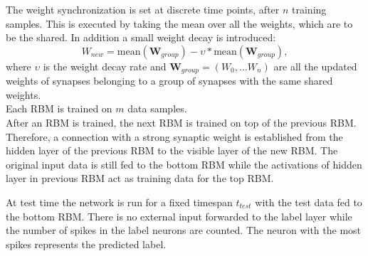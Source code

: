 The weight synchronization is set at discrete time points, after $n$ training samples.
This is executed by taking the mean over all the weights, which are to be the shared.
In addition a small weight decay is introduced:
\[
W_{new} = \text{mean}(\textbf{W}_{group}) - \upsilon * \text{mean}(\textbf{W}_{group}) , 
\]
where $\upsilon$ is the weight decay rate and $\textbf{W}_{group} = (W_0 ,... W_n)$ are all the updated weights of synapses belonging to a group of synapses with the same shared weights.
\\
Each RBM is trained on $m$ data samples.
\\
After an RBM is trained, the next RBM is trained on top of the previous RBM.
Therefore, a connection with a strong synaptic weight is established from the hidden layer of the previous RBM to the visible layer of the new RBM.
The original input data is still fed to the bottom RBM while the activations of hidden layer in previous RBM act as training data for the top RBM.


At test time the network is run for a fixed timespan $t_{test}$ with the test data fed to the bottom RBM.
There is no external input forwarded to the label layer while the number of spikes in the label neurons are counted.
The neuron with the most spikes represents the predicted label.  

 